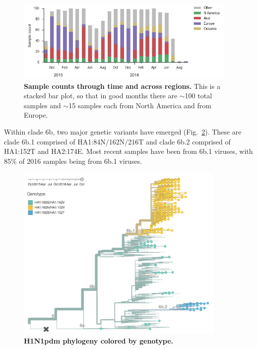 \documentclass[11pt,oneside,letterpaper]{article}
\begin{document}
\begin{figure}[H]
	\centering
	\includegraphics[width=0.95\textwidth]{../figures/sep-2016/H1N1pdm_counts.png}
	\caption{\textbf{Sample counts through time and across regions.}
	This is a stacked bar plot, so that in good months there are $\sim$100 total samples and $\sim$15 samples each from North America and from Europe.
	}
	\label{H1N1pdm_counts}
\end{figure}

\pagebreak

Within clade 6b, two major genetic variants have emerged (Fig.\ \ref{H1N1pdm_tree}). These are clade 6b.1 comprised of HA1:84N/162N/216T and clade 6b.2 comprised of HA1:152T and HA2:174E. Most recent samples have been from 6b.1 viruses, with 85\% of 2016 samples being from 6b.1 viruses.

\begin{figure}[H]
	\centering
	\includegraphics[width=0.9\textwidth]{../figures/sep-2016/H1N1pdm_tree.png}
	\caption{\textbf{H1N1pdm phylogeny colored by genotype.}
	}
	\label{H1N1pdm_tree}
\end{figure}
\end{document}
